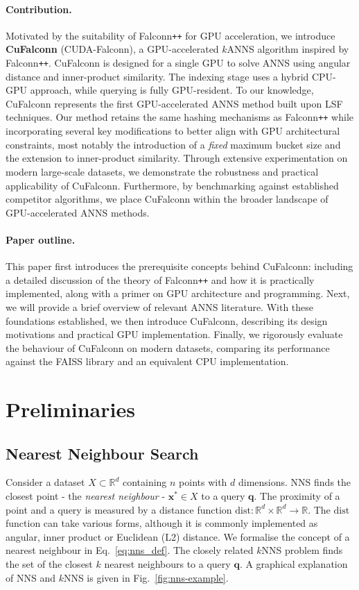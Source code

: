 \documentclass{article}
\newcommand{\Real}{\mathbb{R}}
\newcommand{\bxs}{\mathbf{x}^*}
\newcommand{\bq}{\mathbf{q}}
\newcommand{\dist}{\mathrm{dist}}
\newcommand{\cf}{CuFalconn\xspace}
\newcommand{\fpp}{Falconn\texttt{++}\xspace}
\begin{document}
\paragraph{Contribution.} Motivated by the suitability of \fpp for GPU acceleration, we introduce \textbf{\cf} (CUDA-Falconn), a GPU-accelerated $k$ANNS algorithm inspired by \fpp. \cf is designed for a single GPU to solve ANNS using angular distance and inner-product similarity. The indexing stage uses a hybrid CPU-GPU approach, while querying is fully GPU-resident. To our knowledge, \cf represents the first GPU-accelerated ANNS method built upon LSF techniques. Our method retains the same hashing mechanisms as \fpp while incorporating several key modifications to better align with GPU architectural constraints, most notably the introduction of a \emph{fixed} maximum bucket size and the extension to inner-product similarity. Through extensive experimentation on modern large-scale datasets, we demonstrate the robustness and practical applicability of \cf. Furthermore, by benchmarking against established competitor algorithms, we place \cf within the broader landscape of GPU-accelerated ANNS methods.

\paragraph{Paper outline.} This paper first introduces the prerequisite concepts behind \cf: including a detailed discussion of the theory of \fpp and how it is practically implemented, along with a primer on GPU architecture and programming. Next, we will provide a brief overview of relevant ANNS literature. With these foundations established, we then introduce \cf, describing its design motivations and practical GPU implementation. Finally, we rigorously evaluate the behaviour of \cf on modern datasets, comparing its performance against the FAISS library \cite{douze2025faiss} and an equivalent CPU implementation.

\section{Preliminaries}

\subsection{Nearest Neighbour Search}
\label{sec:anns}

Consider a dataset $X \subset \Real^d$ containing $n$ points with $d$ dimensions. NNS finds the closest point - the \emph{nearest neighbour} -  $\bxs \in X$ to a query $\bq$. The proximity of a point and a query is measured by a distance function $\dist: \Real^d \times \Real^d \rightarrow \Real$. The $\dist$ function can take various forms, although it is commonly implemented as angular, inner product or Euclidean (L2) distance. We formalise the concept of a nearest neighbour in Eq.~\ref{eq:nns_def}. The closely related $k$NNS problem finds the set of the closest $k$ nearest neighbours to a query $\bq$. A graphical explanation of NNS and $k$NNS is given in Fig.~\ref{fig:nns-example}.
\end{document}
